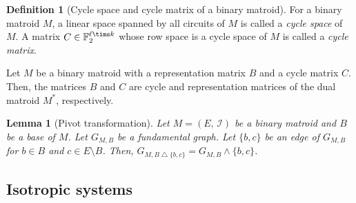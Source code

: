 \documentclass[twoside,10pt]{article}
\newtheorem{lemma}[theorem]{Lemma}
\theoremstyle{definition}
\newtheorem{definition}[theorem]{Definition}
\theoremstyle{remark}
\begin{document}
\begin{definition}[Cycle space and cycle matrix of a binary matroid]
For a binary matroid $M$, a linear space spanned by all circuits of $M$ is called a \textit{cycle space} of $M$.
A matrix $C\in\mathbb{F}_2^{\ell\tims k}$ whose row space is a cycle space of $M$ is called a \textit{cycle matrix}.
\end{definition}

Let $M$ be a binary matroid with a representation matrix $B$ and a cycle matrix $C$.
Then, the matrices $B$ and $C$ are cycle and representation matrices of the dual matroid $M^*$, respectively.
\fi

\begin{lemma}[Pivot transformation]
Let $M=(E,\,\mathcal{I})$ be a binary matroid and $B$ be a base of $M$.
Let $G_{M,B}$ be a fundamental graph.
Let $\{b,c\}$ be an edge of $G_{M,B}$ for $b\in B$ and $c\in E\setminus B$.
Then, $G_{M,B\bigtriangleup\{b,c\}} = G_{M,B} \wedge \{b,c\}$.
\end{lemma}


\subsection{Isotropic systems}
\end{document}
